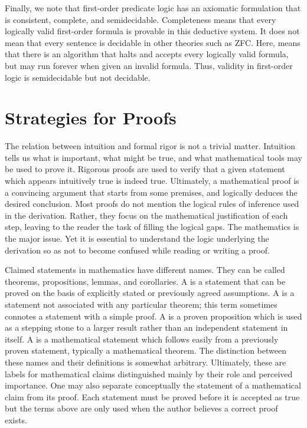 Finally, we note that first-order predicate logic has an axiomatic formulation that is consistent, complete, and semidecidable.
Completeness means that every logically valid first-order formula is provable in this deductive system.
It does not mean that every sentence is decidable in other theories such as ZFC.
Here,  means that there is an algorithm that halts and accepts every logically valid formula, but may run forever when given an invalid formula.
Thus, validity in first-order logic is semidecidable but not decidable.



\section{Strategies for Proofs}\label{section:StrategiesForProofs}

The relation between intuition and formal rigor is not a trivial matter.
Intuition tells us what is important, what might be true, and what mathematical tools may be used to prove it.
Rigorous proofs are used to verify that a given statement which appears intuitively true is indeed true.
Ultimately, a mathematical proof is a convincing argument that starts from some premises, and logically deduces the desired conclusion.
Most proofs do not mention the logical rules of inference used in the derivation.
Rather, they focus on the mathematical justification of each step, leaving to the reader the task of filling the logical gaps.
The mathematics is the major issue.
Yet it is essential to understand the logic underlying the derivation so as not to become confused while reading or writing a proof.

Claimed statements in mathematics have different names.
They can be called theorems, propositions, lemmas, and corollaries.
A  is a statement that can be proved on the basis of explicitly stated or previously agreed assumptions.
A  is a statement not associated with any particular theorem; this term sometimes connotes a statement with a simple proof.
A  is a proven proposition which is used as a stepping stone to a larger result rather than an independent statement in itself.
A  is a mathematical statement which follows easily from a previously proven statement, typically a mathematical theorem. 
The distinction between these names and their definitions is somewhat arbitrary.
Ultimately, these are labels for mathematical claims distinguished mainly by their role and perceived importance.
One may also separate conceptually the statement of a mathematical claim from its proof.
Each statement must be proved before it is accepted as true but the terms above are only used when the author believes a correct proof exists.

